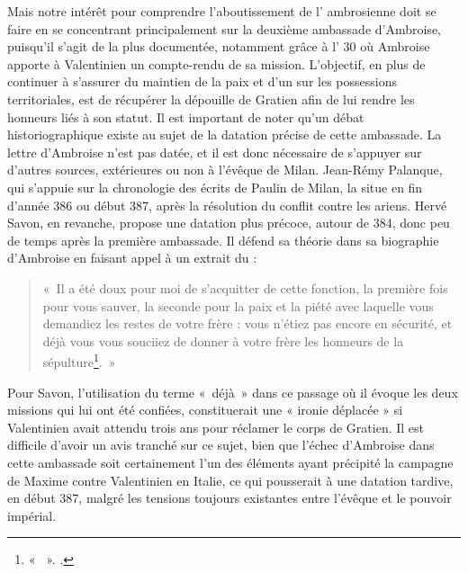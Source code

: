 \bigskip

Mais notre intérêt pour comprendre l'aboutissement de l' ambrosienne doit se faire en se concentrant principalement sur la deuxième ambassade d'Ambroise, puisqu'il s'agit de la plus documentée, notamment grâce à l' 30 où Ambroise apporte à Valentinien un compte-rendu de sa mission. L'objectif, en plus de continuer à s'assurer du maintien de la paix et d'un  sur les possessions territoriales, est de récupérer la dépouille de Gratien afin de lui rendre les honneurs liés à son statut. Il est important de noter qu'un débat historiographique existe au sujet de la datation précise de cette ambassade. La lettre d'Ambroise n'est pas datée, et il est donc nécessaire de s'appuyer sur d'autres sources, extérieures ou non à l'évêque de Milan. Jean-Rémy Palanque, qui s'appuie sur la chronologie des écrits de Paulin de Milan, la situe en fin d'année 386 ou début 387, après la résolution du conflit contre les ariens. Hervé Savon, en revanche, propose une datation plus précoce, autour de 384, donc peu de temps après la première ambassade. Il défend sa théorie dans sa biographie d'Ambroise en faisant appel à un extrait du  :

\bigskip

\begin{quote} «~Il a été doux pour moi de s'acquitter de cette fonction, la première fois pour vous sauver, la seconde pour la paix et la piété avec laquelle vous demandiez les restes de votre frère : vous n'étiez pas encore en sécurité, et déjà vous vous souciiez de donner à votre frère les honneurs de la sépulture\footnote{« ~». \cite[]{ambroise_mort_valentinien}.}.~» \end{quote}

\bigskip

Pour Savon, l'utilisation du terme «~déjà~» dans ce passage où il évoque les deux missions qui lui ont été confiées, constituerait une « ironie déplacée » si Valentinien avait attendu trois ans pour réclamer le corps de Gratien\autocite[200]{savon_ambroise}. Il est difficile d'avoir un avis tranché sur ce sujet, bien que l'échec d'Ambroise dans cette ambassade soit certainement l'un des éléments ayant précipité la campagne de Maxime contre Valentinien en Italie, ce qui pousserait à une datation tardive, en début 387, malgré les tensions toujours existantes entre l'évêque et le pouvoir impérial.


